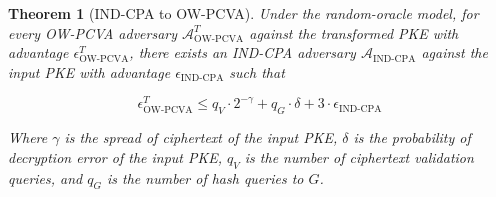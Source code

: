 \documentclass{article}
\newtheorem{theorem}{Theorem}[section]
\begin{document}
\begin{theorem}[IND-CPA to OW-PCVA]\label{cpa-to-pcva}
    Under the random-oracle model, for every OW-PCVA adversary $\mathcal{A}^T_\text{OW-PCVA}$ against the transformed PKE with advantage $\epsilon^T_\text{OW-PCVA}$, there exists an IND-CPA adversary $\mathcal{A}_\text{IND-CPA}$ against the input PKE with advantage $\epsilon_\text{IND-CPA}$ such that

    $$
    \epsilon^T_\text{OW-PCVA} 
        \leq q_V \cdot 2^{-\gamma} 
            + q_G \cdot \delta 
            + 3\cdot\epsilon_\text{IND-CPA}
    $$

    Where $\gamma$ is the spread of ciphertext of the input PKE, $\delta$ is the probability of decryption error of the input PKE, $q_V$ is the number of ciphertext validation queries, and $q_G$ is the number of hash queries to $G$.
\end{theorem}
\end{document}

